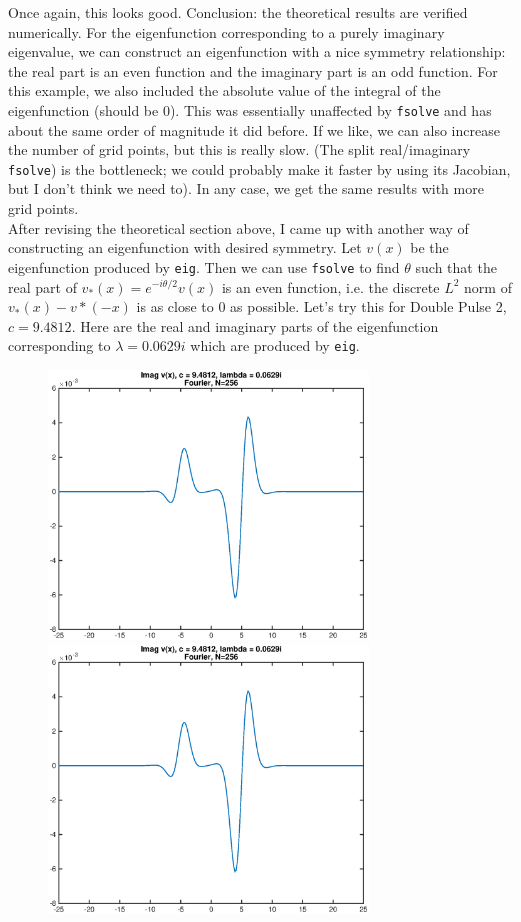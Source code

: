 \documentclass[12pt]{article}
\begin{document}
Once again, this looks good. Conclusion: the theoretical results are verified numerically. For the eigenfunction corresponding to a purely imaginary eigenvalue, we can construct an eigenfunction with a nice symmetry relationship: the real part is an even function and the imaginary part is an odd function. For this example, we also included the absolute value of the integral of the eigenfunction (should be 0). This was essentially unaffected by \texttt{fsolve} and has about the same order of magnitude it did before. If we like, we can also increase the number of grid points, but this is really slow. (The split real/imaginary \texttt{fsolve}) is the bottleneck; we could probably make it faster by using its Jacobian, but I don't think we need to). In any case, we get the same results with more grid points.\\

After revising the theoretical section above, I came up with another way of constructing an eigenfunction with desired symmetry. Let $v(x)$ be the eigenfunction produced by \texttt{eig}. Then we can use \texttt{fsolve} to find $\theta$ such that the real part of $v_*(x) = e^{-i \theta/2} v(x)$ is an even function, i.e. the discrete $L^2$ norm of $v_*(x) - v*(-x)$ is as close to 0 as possible. Let's try this for Double Pulse 2, $c = 9.4812$. Here are the real and imaginary parts of the eigenfunction corresponding to $\lambda = 0.0629i$ which are produced by \texttt{eig}.

\begin{figure}[H]
\includegraphics[width=8.5cm]{2eigenfnreal.eps}
\includegraphics[width=8.5cm]{2eigenfnimag.eps}
\end{figure}
\end{document}
